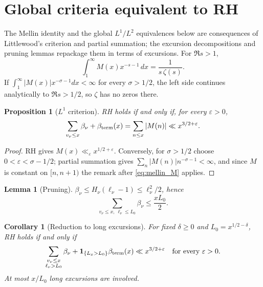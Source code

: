 \documentclass[11pt]{amsart}
\numberwithin{equation}{section}
\theoremstyle{plain}
\newtheorem{proposition}[theorem]{Proposition}
\newtheorem{lemma}[theorem]{Lemma}
\newtheorem{corollary}[theorem]{Corollary}
\theoremstyle{definition}
\theoremstyle{remark}
\newcommand{\eps}{\varepsilon}
\begin{document}
\section{Global criteria equivalent to RH}
\label{sec:criteria}

The Mellin identity and the global $L^1/L^2$ equivalences below are
consequences of Littlewood's criterion and partial summation; the excursion
decompositions and pruning lemmas repackage them in terms of excursions.
For $\Re s>1$,
\begin{equation}
\label{eq:mellin_M}
  \int_1^\infty M(x)x^{-s-1}\,dx=\frac{1}{s\,\zeta(s)} .
\end{equation}
If $\int_1^\infty|M(x)|x^{-\sigma-1}dx<\infty$ for every $\sigma>1/2$, the
left side continues analytically to $\Re s>1/2$, so $\zeta$ has no zeros
there.

\begin{proposition}[$L^1$ criterion]
\label{prop:L1}
RH holds if and only if, for every $\eps>0$,
\begin{equation}
\label{eq:L1_criterion}
  \sum_{v_\nu\le x}\beta_\nu+\beta_{\rm term}(x)=\sum_{n\le x}|M(n)|
  \ll x^{3/2+\eps}.
\end{equation}
\end{proposition}

\begin{proof}
RH gives $M(x)\ll_\eps x^{1/2+\eps}$. Conversely, for $\sigma>1/2$ choose
$0<\eps<\sigma-1/2$; partial summation gives
$\sum_n|M(n)|n^{-\sigma-1}<\infty$, and since $M$ is constant on $[n,n+1)$
the remark after \eqref{eq:mellin_M} applies.
\end{proof}

\begin{lemma}[Pruning]
\label{lem:pruning}
$\beta_\nu\le H_\nu(\ell_\nu-1)\le\ell_\nu^2/2$, hence
\begin{equation}
\label{eq:pruning}
  \sum_{v_\nu\le x,\ \ell_\nu\le L_0}\beta_\nu\le\frac{xL_0}{2}.
\end{equation}
\end{lemma}

\begin{corollary}[Reduction to long excursions]
\label{cor:long}
For fixed $\delta\ge0$ and $L_0=x^{1/2-\delta}$, RH holds if and only if
\begin{equation}
\label{eq:long_reduction}
  \sum_{\substack{v_\nu\le x\\ \ell_\nu>L_0}}\beta_\nu
  +\mathbf 1_{\{L_x>L_0\}}\beta_{\rm term}(x)\ll x^{3/2+\eps}
  \quad\text{for every }\eps>0.
\end{equation}
At most $x/L_0$ long excursions are involved.
\end{corollary}
\end{document}
